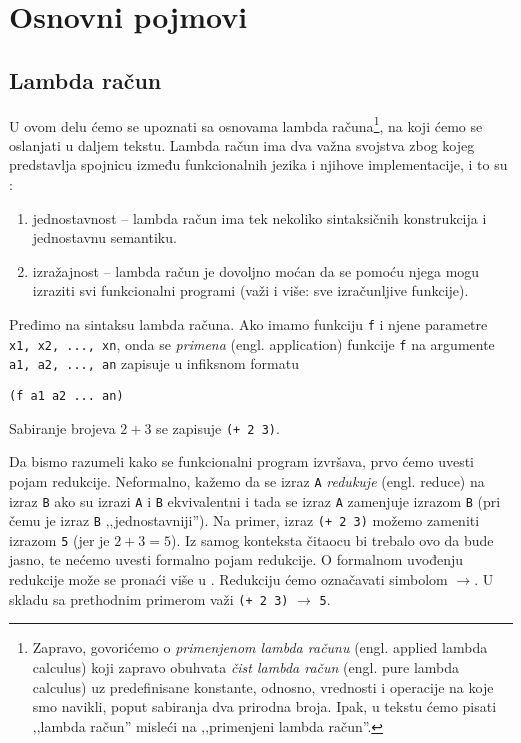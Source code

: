\section{Osnovni pojmovi}
\label{sec:osnovni pojmovi}

\subsection{Lambda račun}
\label{subsec:lambda racun}

U ovom delu ćemo se upoznati sa osnovama lambda računa\footnote{Zapravo, govorićemo o \textit{primenjenom lambda računu} (engl. applied lambda calculus) koji zapravo obuhvata \textit{čist lambda račun} (engl. pure lambda calculus) uz predefinisane konstante, odnosno, vrednosti i operacije na koje smo navikli, poput sabiranja dva prirodna broja. Ipak, u tekstu ćemo pisati ‚‚lambda račun'' misleći na ‚‚primenjeni lambda račun''.}, na koji ćemo se oslanjati u daljem tekstu. Lambda račun ima dva važna svojstva zbog kojeg predstavlja spojnicu između funkcionalnih jezika i njihove implementacije, i to su \cite{the-implementation-of-functional-programming-languages}:
\begin{enumerate}
	\item jednostavnost -- lambda račun ima tek nekoliko sintaksičnih konstrukcija i jednostavnu semantiku.
	\item izražajnost -- lambda račun je dovoljno moćan da se pomoću njega mogu izraziti svi funkcionalni programi (važi i više: sve izračunljive funkcije).
\end{enumerate}

Pređimo na sintaksu lambda računa. Ako imamo funkciju \verb|f| i njene parametre \verb|x1, x2, ..., xn|, onda se \textit{primena} (engl. application) funkcije \verb|f| na argumente \verb|a1, a2, ..., an| zapisuje u infiksnom formatu
\begin{center}
	\verb|(f a1 a2 ... an)|
\end{center}

\begin{primer}
	Sabiranje brojeva $2+3$ se zapisuje \verb|(+ 2 3)|.
\end{primer}

Da bismo razumeli kako se funkcionalni program izvršava, prvo ćemo uvesti pojam redukcije. Neformalno, kažemo da se izraz \verb|A| \textit{redukuje} (engl. reduce) na izraz \verb|B| ako su izrazi \verb|A| i \verb|B| ekvivalentni i tada se izraz \verb|A| zamenjuje izrazom \verb|B| (pri čemu je izraz \verb|B| ‚‚jednostavniji''). Na primer, izraz \verb|(+ 2 3)| možemo zameniti izrazom \verb|5| (jer je $2+3=5$). Iz samog konteksta čitaocu bi trebalo ovo da bude jasno, te nećemo uvesti formalno pojam redukcije. O formalnom uvođenju redukcije može se pronaći više u \cite{foundations-of-functional-programming}. Redukciju ćemo označavati simbolom $\rightarrow$. U skladu sa prethodnim primerom važi \verb|(+ 2 3)| $\rightarrow$ \verb|5|.

